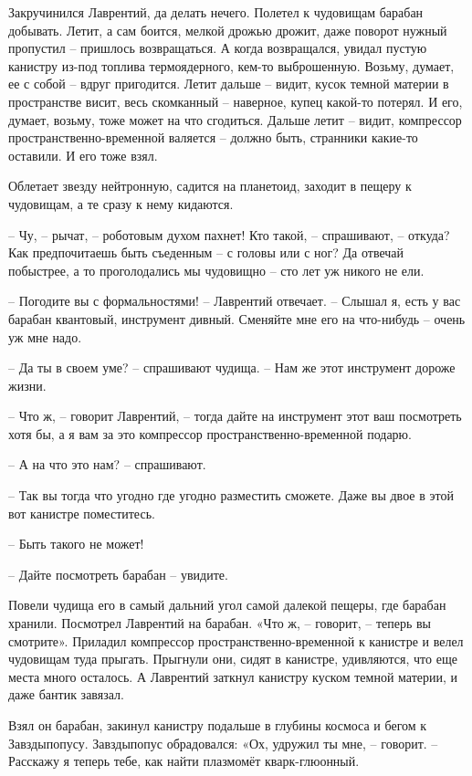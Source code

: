 \documentclass[ebook,oneside,final,openright]{memoir}
\begin{document}
\par
Закручинился Лаврентий, да делать нечего. Полетел к чудовищам барабан добывать. Летит, а сам боится, мелкой дрожью дрожит, даже поворот нужный пропустил – пришлось возвращаться. А когда возвращался, увидал пустую канистру из-под топлива термоядерного, кем-то выброшенную. Возьму, думает, ее с собой – вдруг пригодится. Летит дальше – видит, кусок темной материи в пространстве висит, весь скомканный – наверное, купец какой-то потерял. И его, думает, возьму, тоже может на что сгодиться. Дальше летит – видит, компрессор пространственно-временной валяется – должно быть, странники какие-то оставили. И его тоже взял.\par
\par
Облетает звезду нейтронную, садится на планетоид, заходит в пещеру к чудовищам, а те сразу к нему кидаются. \par
– Чу, – рычат, – роботовым духом пахнет! Кто такой, – спрашивают, – откуда? Как предпочитаешь быть съеденным – с головы или с ног? Да отвечай побыстрее, а то проголодались мы чудовищно – сто лет уж никого не ели.\par
– Погодите вы с формальностями! – Лаврентий отвечает. – Слышал я, есть у вас барабан квантовый, инструмент дивный. Сменяйте мне его на что-нибудь – очень уж мне надо.\par
– Да ты в своем уме? – спрашивают чудища. – Нам же этот инструмент дороже жизни.\par
– Что ж, – говорит Лаврентий, – тогда дайте на инструмент этот ваш посмотреть хотя бы, а я вам за это компрессор пространственно-временной подарю.\par
– А на что это нам? – спрашивают.\par
– Так вы тогда что угодно где угодно разместить сможете. Даже вы двое в этой вот канистре поместитесь. \par
– Быть такого не может!\par
– Дайте посмотреть барабан – увидите.\par
\par
Повели чудища его в самый дальний угол самой далекой пещеры, где барабан хранили. Посмотрел Лаврентий на барабан. «Что ж, – говорит, – теперь вы смотрите». Приладил компрессор пространственно-временной к канистре и велел чудовищам туда прыгать. Прыгнули они, сидят в канистре, удивляются, что еще места много осталось. А Лаврентий заткнул канистру куском темной материи, и даже бантик завязал.\par
\par
Взял он барабан, закинул канистру подальше в глубины космоса и бегом к Завздыпопусу. Завздыпопус обрадовался: «Ох, удружил ты мне, – говорит. – Расскажу я теперь тебе, как найти плазмомёт кварк-глюонный.\par
\end{document}
